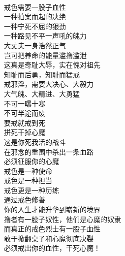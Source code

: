 \begin{poem}[戒出你的血性]
    \begin{multicols}{2}
        \centering~\\
        戒色需要一股子血性 \\ 一种拍案而起的决绝 \\ 一种宁死不屈的狠劲 \\ 一种路见不平一声吼的魄力 \\ 大丈夫一身浩然正气 \\ 岂可把养命的能量滥撸滥泄 \\ 这真是奇耻大辱，实在愧对祖先 \\ 知耻而后勇，知耻而猛戒 \\ 戒邪淫，需要大决心、大毅力 \\ 大气魄、大精进、大勇猛 \\ 不可一曝十寒 \\ 不可半途而废 \\ 要戒就戒到死 \\ 拼死干掉心魔 \\ 这是你死我活的战斗 \\ 在邪念的重围中杀出一条血路 \\ 必须征服你的心魔 \\ 戒色是一种使命 \\ 戒色是一种担当 \\ 戒色更是一种历练 \\ 通过戒色修善 \\ 你的人生才能升华到崭新的境界 \\ 撸者有一股子奴性，他们是心魔的奴隶 \\ 而真正的戒色烈士有一股子血性 \\ 敢于掀翻桌子和心魔彻底决裂 \\ 必须戒出你的血性，干死心魔！
    \end{multicols}
\end{poem}

